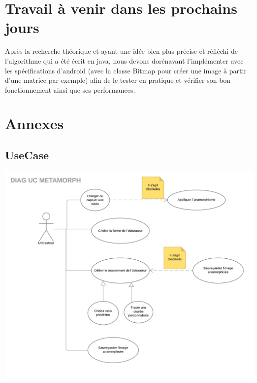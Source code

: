 \documentclass[a4paper,12pt]{report}
\begin{document}
\chapter{Travail à venir dans les prochains jours}
Après la recherche théorique et ayant une idée bien plus précise et réfléchi de l’algorithme qui a été écrit en java, nous devons dorénavant l’implémenter avec
les spécifications d’android (avec la classe Bitmap pour créer une image à partir d’une matrice par exemple) afin de le tester en pratique et vérifier son bon fonctionnement ainsi que ses performances.

\chapter{Annexes}
\section{UseCase}
\begin{center}
 \includegraphics[scale=0.65]{./UC.png}
\end{center}
\end{document}

